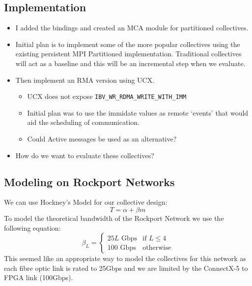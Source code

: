 \documentclass{article}
\begin{document}
  \subsection{Implementation}
  \begin{itemize}
    \item I added the bindings and created an MCA module for partitioned
          collectives.

    \item Initial plan is to implement some of the more popular collectives
          using the existing persistent MPI Partitioned implementation.
          Traditional collectives will act as a baseline
          and this will be an incremental step when we evaluate.

    \item Then implement an RMA version using UCX.
    \begin{itemize}
      \item UCX does not expose \texttt{IBV\_WR\_RDMA\_WRITE\_WITH\_IMM}
      \item Initial plan was to use the immidate values as remote `events' that would
            aid the scheduling of communication.
      \item Could Active messages be used as an alternative?
    \end{itemize}

    \item How do we want to evaluate these collectives?
  \end{itemize}

  \subsection{Modeling on Rockport Networks}
  We can use Hockney's Model for our collective design:
  \begin{equation}
    T = \alpha + \beta m
  \end{equation}
  To model the theoretical bandwidth of the Rockport Network we use the following equation:
  \begin{equation}
    \beta_L =
      \begin{cases}
        25L \text{~Gbps} & \text{if~} L \leq 4 \\
        100 \text{~Gbps} & \text{otherwise}
      \end{cases}
  \end{equation}
  \noindent
  This seemed like an appropriate way to model the collectives for this network
  as each fibre optic link is rated to 25Gbps
  and we are limited by the ConnectX-5 to FPGA link (100Gbps).
\end{document}
